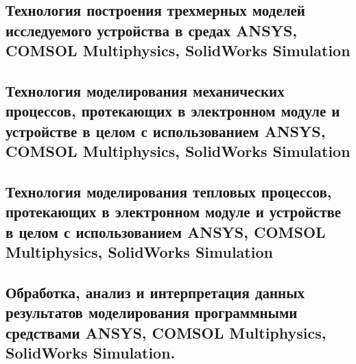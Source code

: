 \subsection{Технология построения трехмерных моделей исследуемого
  устройства в средах ANSYS, COMSOL Multiphysics, SolidWorks Simulation}

\subsection{Технология моделирования механических процессов,
протекающих в электронном модуле и устройстве в целом с
использованием ANSYS, COMSOL Multiphysics, SolidWorks Simulation}

\subsection{Технология моделирования тепловых процессов,
протекающих в электронном модуле и устройстве в целом с
использованием ANSYS, COMSOL Multiphysics, SolidWorks Simulation}


\subsection{Обработка, анализ и интерпретация данных результатов
моделирования программными средствами ANSYS, COMSOL Multiphysics,
SolidWorks Simulation.}




\newpage

